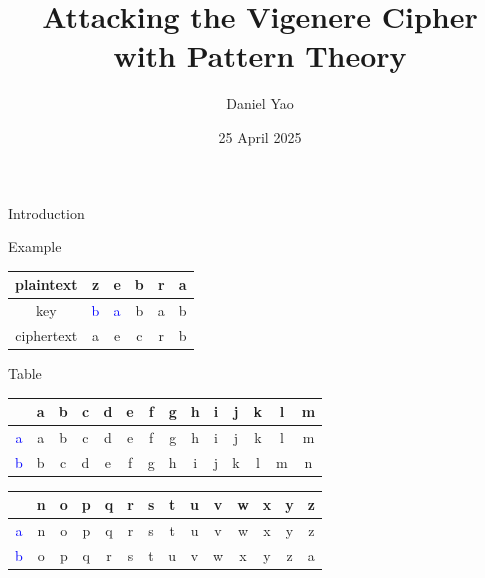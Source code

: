 \documentclass{beamer}
\title{Attacking the Vigenere Cipher\\with Pattern Theory}
\author{Daniel Yao}
\institute{Johns Hopkins University}
\date{25 April 2025}
\begin{document}
\begin{frame}

\titlepage

\end{frame}


\begin{frame}{Introduction}

\begin{block}{Example}
\end{block}

\vspace{-12pt}

\begin{center}
\begin{tabular}{c|ccccc}
  plaintext & z & e & b & r & a \\
  \hline
  key & \textcolor{blue}{b} & \textcolor{blue}{a} & b & a & b \\
  \hline
  ciphertext & a & e & c & r & b \\
\end{tabular}
\end{center}

\begin{block}{Table}
\end{block}

\vspace{-12pt}

\begin{center}
\begin{tabular}{c|*{13}{c}}
 & a & b & c & d & e & f & g & h & i & j & k & l & m \\
\hline
\textcolor{blue}{a} & a & b & c & d & e & f & g & h & i & j & k & l & m \\
\textcolor{blue}{b} & b & c & d & e & f & g & h & i & j & k & l & m & n \\
\end{tabular}
\end{center}

\begin{center}
\begin{tabular}{c|*{13}{c}}
 & n & o & p & q & r & s & t & u & v & w & x & y & z \\
\hline
\textcolor{blue}{a} & n & o & p & q & r & s & t & u & v & w & x & y & z \\
\textcolor{blue}{b} & o & p & q & r & s & t & u & v & w & x & y & z & a \\
\end{tabular}
\end{center}

\end{frame}
\end{document}

